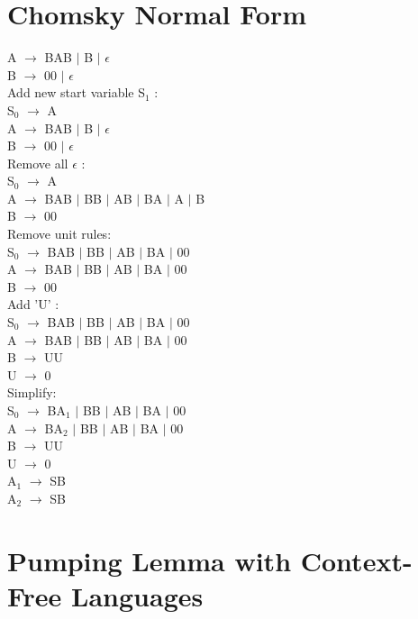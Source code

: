 \documentclass[10pt,letterpaper]{article}
\begin{document}
\section*{Chomsky Normal Form}
	A $\rightarrow$ BAB $\mid$ B $\mid$ $\epsilon$\\
	B $\rightarrow$ 00 $\mid$ $\epsilon$\\
	Add new start variable S$_{1}$ :\\
		S$_{0}$	$\rightarrow$ A\\
		A $\rightarrow$ BAB $\mid$ B $\mid$ $\epsilon$\\
		B $\rightarrow$ 00 $\mid$ $\epsilon$\\		
	Remove all $\epsilon$ :\\
		S$_{0}$	$\rightarrow$ A\\
		A $\rightarrow$ BAB $\mid$ BB $\mid$ AB $\mid$ BA $\mid$ A $\mid$ B \\
		B $\rightarrow$ 00\\
	Remove unit rules:\\
		S$_{0}$	$\rightarrow$ BAB $\mid$ BB $\mid$ AB $\mid$ BA $\mid$ 00\\
		A $\rightarrow$ BAB $\mid$ BB $\mid$ AB $\mid$ BA $\mid$ 00\\
		B $\rightarrow$ 00\\
	Add 'U' :\\
		S$_{0}$	$\rightarrow$ BAB $\mid$ BB $\mid$ AB $\mid$ BA $\mid$ 00\\
		A $\rightarrow$ BAB $\mid$ BB $\mid$ AB $\mid$ BA $\mid$ 00\\
		B $\rightarrow$ UU\\
		U $\rightarrow$ 0\\
	Simplify: \\
		S$_{0}$	$\rightarrow$ BA$_{1}$ $\mid$ BB $\mid$ AB $\mid$ BA $\mid$ 00\\
		A $\rightarrow$ BA$_{2}$ $\mid$ BB $\mid$ AB $\mid$ BA $\mid$ 00\\
		B $\rightarrow$ UU\\
		U $\rightarrow$ 0\\
		A$_{1}$ $\rightarrow$ SB\\
		A$_{2}$ $\rightarrow$ SB\\
		
\section*{Pumping Lemma with Context-Free Languages}
\end{document}
